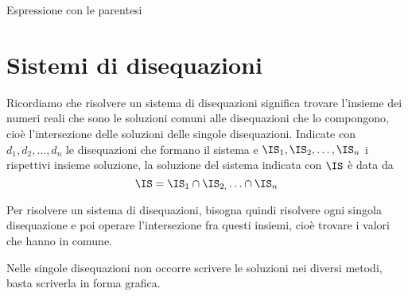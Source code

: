 \begin{esempio}
\begin{itemize}
\begin{minipage}{.32\textwidth}
 \begin{center}

  \vspace{1em}
 \end{center}
  \end{minipage}
  \begin{minipage}{.32\textwidth}
  Espressione con le parentesi\\[-.3em]

 \begin{center}

  \vspace{.8em}
 \end{center}
  \end{minipage}

\end{itemize}
\end{esempio}

%

\section{Sistemi di disequazioni}
\label{sec:diseq_sistemi}

Ricordiamo che risolvere un sistema di disequazioni significa trovare
l'insieme dei numeri reali che sono le soluzioni comuni alle disequazioni che
lo compongono, cioè l'intersezione delle soluzioni delle singole
disequazioni.
Indicate con \(d_{1}, d_{2}, \ldots, d_n\) le disequazioni che formano
il sistema e \(\IS_{1}, \IS_{2}, \ldots,\IS_n\) i rispettivi insieme
soluzione, la soluzione del sistema indicata con \(\IS\) è data da
\[\IS=\IS_1 \cap \IS_{2,} \ldots \cap \IS_n\]

Per risolvere un sistema di disequazioni, bisogna quindi risolvere ogni
singola disequazione e poi operare l'intersezione fra questi insiemi, cioè
trovare i valori che hanno in comune.

\begin{osservazione}
 Nelle singole disequazioni non occorre scrivere le soluzioni nei diversi
metodi, basta scriverla in forma grafica.
\end{osservazione}

\newpage %

